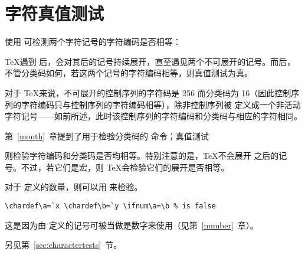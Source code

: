 \documentclass{book}
\begin{document}
\section{字符真值测试}

使用  可检测两个字符记号的字符编码是否相等：
\begin{disp}\end{disp}
\TeX 遇到  后，会对其后的记号持续展开，直至遇见两个不可展开的记号。而后，不管分类码如何，若这两个记号的字符编码相等，则真值测试为真。

对于 \TeX 来说，不可展开的控制序列的字符码是 256 而分类码为 16（因此控制序列的字符编码只与控制序列的字符编码相等），除非控制序列被  定义成一个非活动字符记号——如前所述，此时该控制序列的字符编码和分类码与相应的字符相同。

第~\ref{month}~章提到了用于检验分类码的  命令；真值测试
\begin{disp}\end{disp}
则检验字符编码和分类码是否均相等。特别注意的是，\TeX 不会展开  之后的记号。不过，若它们是宏，则 \TeX 会检验它们的展开是否相等。

对于  定义的数量，则可以用  来检验。
\begin{verbatim}
\chardef\a=`x \chardef\b=`y \ifnum\a=\b % is false
\end{verbatim}
这是因为由  定义的记号可被当做是数字来使用（见第~\ref{number}~章）。

另见第~\ref{sec:charactertests}~节。
\end{document}
